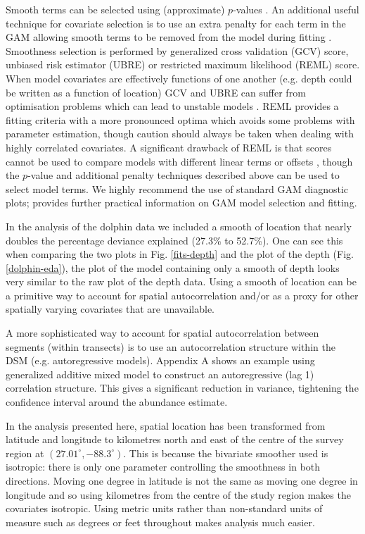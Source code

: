 \documentclass[a4paper,12pt]{article}
\begin{document}
Smooth terms can be selected using (approximate) $p$-values \cite[][Section 4.8.5]{Wood:2006wz}. An additional useful technique for covariate selection is to use an extra penalty for each term in the GAM allowing smooth terms to be removed from the model during fitting \citep[illustrated in Appendix A;][]{Wood:ub}. Smoothness selection is performed by generalized cross validation (GCV) score, unbiased risk estimator (UBRE) or restricted maximum likelihood (REML) score. When model covariates are effectively functions of one another (e.g. depth could be written as a function of location) GCV and UBRE can suffer from optimisation problems \cite[][Section 4.5.3]{Wood:2006wz} which can lead to unstable models \citep[][]{Wood:ub}. REML provides a fitting criteria with a more pronounced optima which avoids some problems with parameter estimation, though caution should always be taken when dealing with highly correlated covariates. A significant drawback of REML is that scores cannot be used to compare models with different linear terms or offsets \cite[][]{Wood:ub}, though the $p$-value and additional penalty techniques described above can be used to select model terms. We highly recommend the use of standard GAM diagnostic plots; \cite{Wood:2006wz} provides further practical information on GAM model selection and fitting.

In the analysis of the dolphin data we included a smooth of location that nearly doubles the percentage deviance explained (27.3\% to 52.7\%). One can see this when comparing the two plots in Fig. \ref{fits-depth} and the plot of the depth (Fig. \ref{dolphin-eda}), the plot of the model containing only a smooth of depth looks very similar to the raw plot of the depth data. Using a smooth of location can be a primitive way to account for spatial autocorrelation and/or as a proxy for other spatially varying covariates that are unavailable. 

A more sophisticated way to account for spatial autocorrelation between segments (within transects) is to use an autocorrelation structure within the DSM (e.g. autoregressive models). Appendix A shows an example using generalized additive mixed model \cite[GAMMs;][Section 6.6, see Appendix A for an example]{Wood:2006wz} to construct an autoregressive (lag 1) correlation structure. This gives a significant reduction in variance, tightening the confidence interval around the abundance estimate.

In the analysis presented here, spatial location has been transformed from latitude and longitude to kilometres north and east of the centre of the survey region at $(27.01^\circ, -88.3^\circ)$. This is because the bivariate smoother used \citep[the thin plate spline;][]{Wood:2003tc} is isotropic: there is only one parameter controlling the smoothness in both directions. Moving one degree in latitude is not the same as moving one degree in longitude and so using kilometres from the centre of the study region makes the covariates isotropic. Using metric units rather than non-standard units of measure such as degrees or feet throughout makes analysis much easier.
\end{document}
